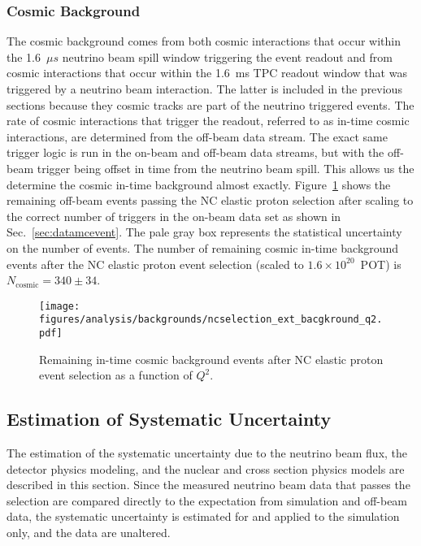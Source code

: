   \subsubsection{Cosmic Background}
    The cosmic background comes from both cosmic interactions that occur within
    the 1.6~$\mu s$ neutrino beam spill window triggering the event readout and
    from cosmic interactions that occur within the 1.6~ms TPC readout window
    that was triggered by a neutrino beam interaction. The latter is included
    in the previous sections because they cosmic tracks are part of the
    neutrino triggered events. The rate of cosmic interactions that trigger the
    readout, referred to as in-time cosmic interactions, are determined from
    the off-beam data stream. The exact same trigger logic is run in the
    on-beam and off-beam data streams, but with the off-beam trigger being
    offset in time from the neutrino beam spill. This allows us the determine
    the cosmic in-time background almost exactly.  Figure~\ref{fig:selectedext}
    shows the remaining off-beam events passing the NC elastic proton selection
    after scaling to the correct number of triggers in the on-beam data set as
    shown in Sec.~\ref{sec:datamcevent}. The pale gray box represents the
    statistical uncertainty on the number of events. The number
    of remaining cosmic in-time background events after the NC elastic proton event
    selection (scaled to $1.6\times 10^{20}$~POT) is $N_{\textrm{cosmic}} = 340
    \pm 34$.
    \begin{figure}[ht]
      \centering
      \texttt{[image: figures/analysis/backgrounds/ncselection\_ext\_bacgkround\_q2.pdf]}
      \caption{Remaining in-time cosmic background events after NC elastic
      proton event selection as a function of $Q^2$.}
      \label{fig:selectedext}
    \end{figure}
  

\subsection{Estimation of Systematic Uncertainty}\label{sec:systematics}
  The estimation of the systematic uncertainty due to the neutrino beam flux,
  the detector physics modeling, and the nuclear and cross section physics
  models are described in this section. Since the measured neutrino beam data
  that passes the selection are compared directly to the expectation from
  simulation and off-beam data, the systematic uncertainty is estimated for and
  applied to the simulation only, and the data are unaltered.
